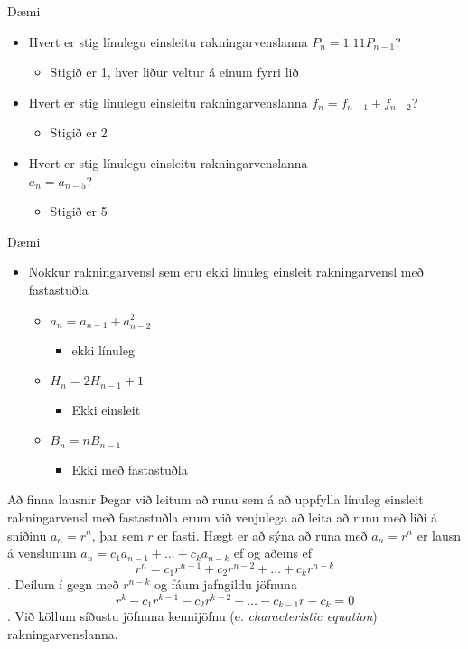 \documentclass[handout]{beamer}
\begin{document}
\begin{frame}{Dæmi}
\begin{itemize}[<+->]
 \item Hvert er stig línulegu einsleitu rakningarvenslanna $P_n = 1.11P_{n-1}$?
 \begin{itemize}
  \item Stigið er 1, hver liður veltur á einum fyrri lið
 \end{itemize}
 \item Hvert er stig línulegu einsleitu rakningarvenslanna $f_n = f_{n-1} + f_{n-2}$?
 \begin{itemize}
  \item Stigið er 2
 \end{itemize}
 \item Hvert er stig línulegu einsleitu rakningarvenslanna\\ $a_n = a_{n-5}$?
 \begin{itemize}
  \item Stigið er 5
 \end{itemize}
\end{itemize}
\end{frame}

\begin{frame}{Dæmi}
\begin{itemize}
 \item Nokkur rakningarvensl sem eru ekki línuleg einsleit rakningarvensl með fastastuðla
 \begin{itemize}[<+->]
  \item $a_n = a_{n-1} + a_{n-2}^2$
  \begin{itemize}
   \item ekki línuleg
  \end{itemize}
  \item $H_n = 2H_{n-1} + 1$
  \begin{itemize}
   \item Ekki einsleit
  \end{itemize}
  \item $B_n = nB_{n-1}$
  \begin{itemize}
   \item Ekki með fastastuðla
  \end{itemize}
 \end{itemize}
\end{itemize}
\end{frame}

\begin{frame}{Að finna lausnir}
Þegar við leitum að runu sem á að uppfylla línuleg einsleit rakningarvensl með fastastuðla erum við venjulega að leita að runu með liði á sniðinu $a_n = r^n$, þar sem $r$ er fasti. Hægt er að sýna að runa með $a_n = r^n$ er lausn á venslunum $ a_n = c_1 a_{n-1} + \ldots + c_ka_{n-k}$ ef og aðeins ef
\[
 r^n = c_1r^{n-1} + c_2r^{n-2} + \ldots + c_kr^{n-k}
\]
. Deilum í gegn með $r^{n-k}$ og fáum jafngildu jöfnuna
\[
 r^k - c_1r^{k-1} - c_2r^{k-2} - \ldots - c_{k-1}r - c_k = 0
\]
. Við köllum síðustu jöfnuna kennijöfnu (e. \emph{characteristic equation}) rakningarvenslanna.
\end{frame}
\end{document}

